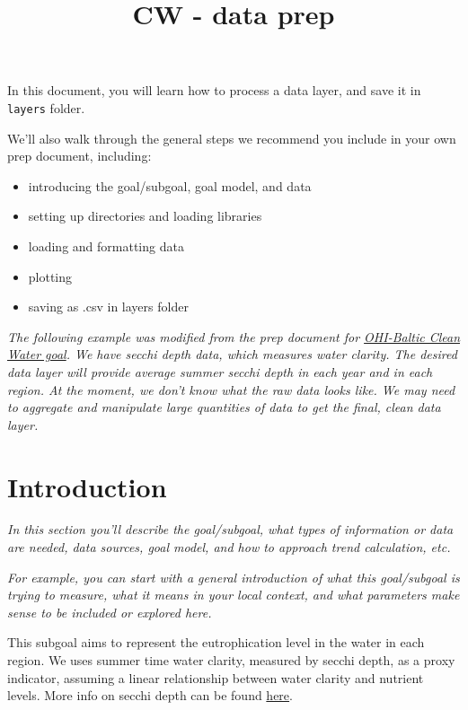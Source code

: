 \documentclass[
]{article}
\title{CW - data prep}
\author{}
\date{\vspace{-2.5em}}
\providecommand{\tightlist}{%
  \setlength{\itemsep}{0pt}\setlength{\parskip}{0pt}}
\begin{document}
\maketitle

In this document, you will learn how to process a data layer, and save
it in \texttt{layers} folder.

We'll also walk through the general steps we recommend you include in
your own prep document, including:

\begin{itemize}
\tightlist
\item
  introducing the goal/subgoal, goal model, and data
\item
  setting up directories and loading libraries
\item
  loading and formatting data
\item
  plotting
\item
  saving as .csv in layers folder
\end{itemize}

\emph{The following example was modified from the prep document for
\href{https://github.com/OHI-Science/bhi/blob/draft/baltic2015/prep/CW/eutrophication/eutrophication_prep.Rmd}{OHI-Baltic
Clean Water goal}. We have secchi depth data, which measures water
clarity. The desired data layer will provide average summer secchi depth
in each year and in each region. At the moment, we don't know what the
raw data looks like. We may need to aggregate and manipulate large
quantities of data to get the final, clean data layer. }

\hypertarget{introduction}{%
\section{Introduction}\label{introduction}}

\emph{In this section you'll describe the goal/subgoal, what types of
information or data are needed, data sources, goal model, and how to
approach trend calculation, etc.}

\emph{For example, you can start with a general introduction of what
this goal/subgoal is trying to measure, what it means in your local
context, and what parameters make sense to be included or explored
here.}

This subgoal aims to represent the eutrophication level in the water in
each region. We uses summer time water clarity, measured by secchi
depth, as a proxy indicator, assuming a linear relationship between
water clarity and nutrient levels. More info on secchi depth can be
found
\href{http://www.helcom.fi/baltic-sea-trends/indicators/water-clarity}{here}.
\end{document}
